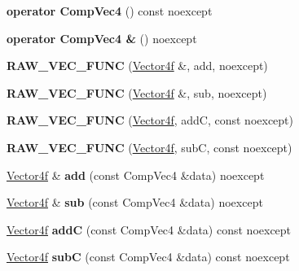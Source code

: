 \begin{DoxyCompactItemize}
{\bfseries operator Comp\+Vec4} () const noexcept
\item 
\mbox{\label{class_vector4f_af0c396fa497b9320b5e60fa18202f466}} 
{\bfseries operator Comp\+Vec4 \&} () noexcept
\item 
\mbox{\label{class_vector4f_a2d37e0b54b51d1f99bac9f073a573cbe}} 
{\bfseries R\+A\+W\+\_\+\+V\+E\+C\+\_\+\+F\+U\+NC} (\mbox{\hyperlink{class_vector4f}{Vector4f}} \&, add, noexcept)
\item 
\mbox{\label{class_vector4f_a3988b147fa6edb6b578ebe26143ccce4}} 
{\bfseries R\+A\+W\+\_\+\+V\+E\+C\+\_\+\+F\+U\+NC} (\mbox{\hyperlink{class_vector4f}{Vector4f}} \&, sub, noexcept)
\item 
\mbox{\label{class_vector4f_a34fcc116fbfbb731739eb91bb781679c}} 
{\bfseries R\+A\+W\+\_\+\+V\+E\+C\+\_\+\+F\+U\+NC} (\mbox{\hyperlink{class_vector4f}{Vector4f}}, addC, const noexcept)
\item 
\mbox{\label{class_vector4f_a97d01ee80df6b718397484617e9a7346}} 
{\bfseries R\+A\+W\+\_\+\+V\+E\+C\+\_\+\+F\+U\+NC} (\mbox{\hyperlink{class_vector4f}{Vector4f}}, subC, const noexcept)
\item 
\mbox{\label{class_vector4f_a52f3097f75ef35e72d23a194d323e0f8}} 
\mbox{\hyperlink{class_vector4f}{Vector4f}} \& {\bfseries add} (const Comp\+Vec4 \&data) noexcept
\item 
\mbox{\label{class_vector4f_ae3b7bfc79e999fecfd07e4bf80ebd7b9}} 
\mbox{\hyperlink{class_vector4f}{Vector4f}} \& {\bfseries sub} (const Comp\+Vec4 \&data) noexcept
\item 
\mbox{\label{class_vector4f_a911f937e588ea1c9569c5bdbeff8f166}} 
\mbox{\hyperlink{class_vector4f}{Vector4f}} {\bfseries addC} (const Comp\+Vec4 \&data) const noexcept
\item 
\mbox{\label{class_vector4f_af519e3b433cf02e0c96952a444a8f107}} 
\mbox{\hyperlink{class_vector4f}{Vector4f}} {\bfseries subC} (const Comp\+Vec4 \&data) const noexcept
\item 
\mbox{\label{class_vector4f_a0496dd983e45cd188d39b507e8916543}} 

\end{DoxyCompactItemize}
